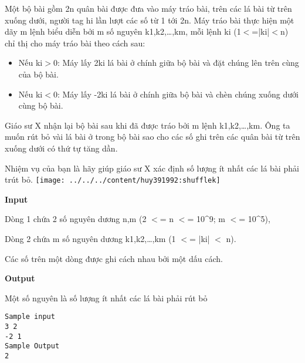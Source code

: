 

Một bộ bài gồm 2n quân bài được đưa vào máy tráo bài, trên các lá bài từ trên xuống dưới, người tag hi lần lượt các số từ 1 tới 2n. Máy tráo bài thực hiện một dãy m lệnh biểu diễn bởi m số nguyên k1,k2,…,km, mỗi lệnh ki (1$<$=|ki|$<$n) chỉ thị cho máy tráo bài theo cách sau:
\begin{itemize}
	\item Nếu ki$>$0: Máy lấy 2ki lá bài ở chính giữa bộ bài và đặt chúng lên trên cùng của bộ bài.
\end{itemize}
\begin{itemize}
	\item Nếu ki$<$0: Máy lấy -2ki lá bài ở chính giữa bộ bài và chèn chúng xuống dưới cùng bộ bài.
\end{itemize}

Giáo sư X nhận lại bộ bài sau khi đã được tráo bởi m lệnh k1,k2,…,km. Ông ta muốn rút bỏ vài lá bài ở trong bộ bài sao cho các số ghi trên các quân bài từ trên xuống dưới có thứ tự tăng dần.

Nhiệm vụ của bạn là hãy giúp giáo sư X xác định số lượng ít nhất các lá bài phải trút bỏ.
\texttt{[image: ../../../content/huy391992:shufflek]}

\textbf{Input}

Dòng 1 chứa 2 số nguyên dương n,m (2 $<$= n $<$= 10\textasciicircum9; m $<$= 10\textasciicircum5),

Dòng 2 chứa m số nguyên dương k1,k2,…,km (1 $<$= |ki| $<$ n).

Các số trên một dòng được ghi cách nhau bởi một dấu cách.

\textbf{Output}

Một số nguyên là số lượng ít nhất các lá bài phải rút bỏ
\begin{verbatim}
Sample input
3 2
-2 1
Sample Output
2\end{verbatim}

 